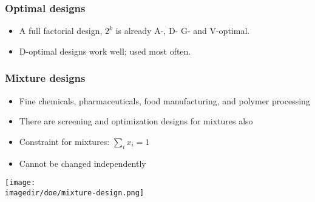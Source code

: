 \begin{frame}\frametitle{Optimal designs}
	\begin{itemize}
		\item	A full factorial design, $2^k$ is already A-, D- G- and V-optimal.
		\item	D-optimal designs work well; used most often.
	\end{itemize}
\end{frame}

\begin{frame}\frametitle{Mixture designs}
	\begin{itemize}
		\item	Fine chemicals, pharmaceuticals, food manufacturing, and polymer processing
		\item	There are screening and optimization designs for mixtures also
		\item	Constraint for mixtures: $\sum_i x_i = 1$
		\item	Cannot be changed independently
	\end{itemize}
	\begin{center}
		\texttt{[image: \\imagedir/doe/mixture-design.png]}
	\end{center}
\end{frame}
